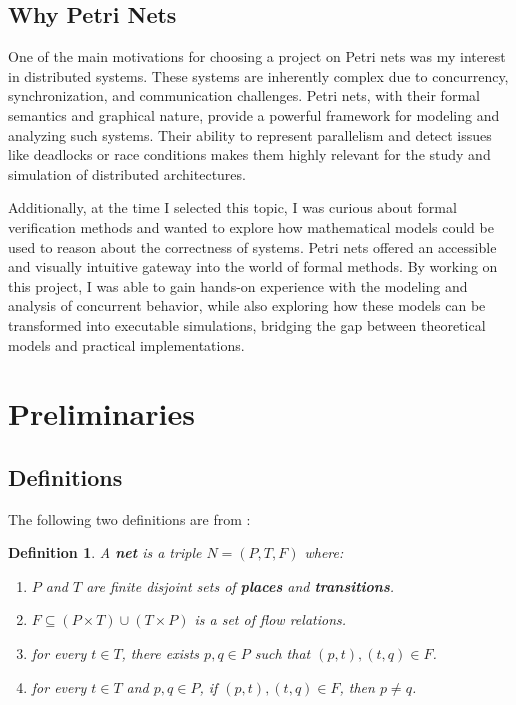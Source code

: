 \documentclass[12pt]{article}
\newtheorem{definition}{Definition}
\begin{document}
    \subsection*{Why Petri Nets}
    One of the main motivations for choosing a project on Petri nets was my interest in distributed systems. These systems are inherently complex due to concurrency, synchronization, and communication challenges. Petri nets, with their formal semantics and graphical nature, provide a powerful framework for modeling and analyzing such systems. Their ability to represent parallelism and detect issues like deadlocks or race conditions makes them highly relevant for the study and simulation of distributed architectures.

    Additionally, at the time I selected this topic, I was curious about formal verification methods and wanted to explore how mathematical models could be used to reason about the correctness of systems. Petri nets offered an accessible and visually intuitive gateway into the world of formal methods. By working on this project, I was able to gain hands-on experience with the modeling and analysis of concurrent behavior, while also exploring how these models can be transformed into executable simulations, bridging the gap between theoretical models and practical implementations.

\section{Preliminaries}
    \subsection{Definitions}
    The following two definitions are from \cite{rozenberg1996elementary}:
    \begin{definition}
        A \textbf{net} is a triple \(N=(P,T,F)\) where: 
        \begin{enumerate}
            \item \(P\) and \(T\) are finite disjoint sets of \textbf{places} and \textbf{transitions}.
            \item \(F \subseteq (P \times T)\cup(T \times P)\) is a set of flow relations.
            \item for every \(t \in T\), there exists $p,q \in P$ such that $(p,t),(t,q) \in F$.
            \item for every $t \in T$ and $p,q \in P$, if $(p,t),(t,q) \in F$, then $p \neq q$.
        \end{enumerate}
    \end{definition}
\end{document}
